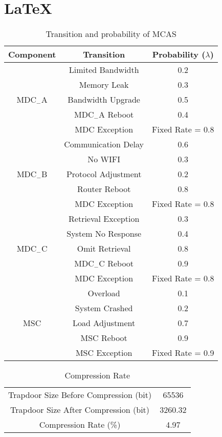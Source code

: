 \documentclass[paper=a4, fontsize=11pt]{scrartcl} %
\numberwithin{equation}{section} %
\numberwithin{figure}{section} %
\numberwithin{table}{section} %
\begin{document}
\section{\LaTeX}
	\begin{table}[H]
		\begin{center}
			\begin{tabular}{c |c |c}
				\hline
				Component & Transition & Probability ($\lambda$)\\
				\hline
				\multirow{5}{*}{MDC$_{-}$A} & Limited Bandwidth &0.2\\
				& Memory Leak & 0.3\\
				&Bandwidth Upgrade & 0.5 \\
				& MDC$_{-}$A Reboot &0.4\\
				&MDC Exception & Fixed Rate = 0.8 \\
				\hline
				\multirow{5}{*}{MDC$_{-}$B}& Communication Delay & 0.6\\
				& No WIFI & 0.3\\
				&Protocol Adjustment & 0.2 \\
				& Router Reboot & 0.8  \\
				&MDC Exception & Fixed Rate = 0.8 \\
				\hline
				\multirow{5}{*}{MDC$_{-}$C} & Retrieval Exception &0.3\\
				& System No Response & 0.4 \\
				&Omit Retrieval & 0.8  \\
				& MDC$_{-}$C Reboot & 0.9\\
				&MDC Exception & Fixed Rate = 0.8 \\
				\hline
				\multirow{5}{*}{MSC} & Overload & 0.1\\
				& System Crashed & 0.2 \\
				& Load Adjustment& 0.7 \\
				& MSC  Reboot & 0.9\\
				&MSC Exception& Fixed Rate = 0.9 \\
				\hline
			\end{tabular}
		\end{center}
		\caption{ Transition and probability of MCAS}
	\end{table}
	
	\begin{table}
		\begin{center}
			\begin{tabular}{ c c}
				\hline
				Trapdoor Size Before Compression (bit) & 65536 \\
				Trapdoor Size After Compression (bit) &3260.32 \\
				Compression Rate (\%) & 4.97 \\
				\hline
			\end{tabular}
		\end{center}
		\caption{Compression Rate}
	\end{table}
	
\end{document}
